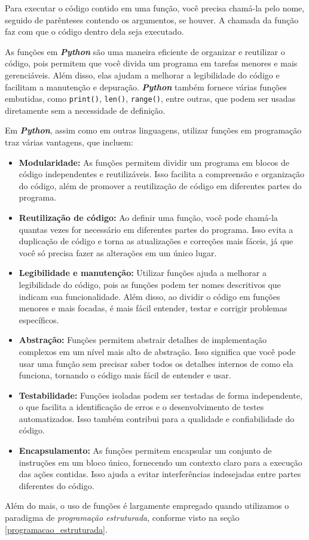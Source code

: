 \documentclass[a4paper, 12pt, onecolumn,singlespacing]{article}
\begin{document}
	Para executar o código contido em uma função, você precisa chamá-la pelo nome, seguido de parênteses contendo os argumentos, se houver. A chamada da função faz com que o código dentro dela seja executado.
	
	As funções em \textbf{\textit{Python}} são uma maneira eficiente de organizar e reutilizar o código, pois permitem que você divida um programa em tarefas menores e mais gerenciáveis. Além disso, elas ajudam a melhorar a legibilidade do código e facilitam a manutenção e depuração. \textbf{\textit{Python}} também fornece várias funções embutidas, como \texttt{print()}, \texttt{len()}, \texttt{range()}, entre outras, que podem ser usadas diretamente sem a necessidade de definição.
	
	Em \textbf{\textit{Python}}, assim como em outras linguagens, utilizar funções em programação traz várias vantagens, que incluem:
	
	\begin{itemize}
		\item \textbf{Modularidade:} As funções permitem dividir um programa em blocos de código independentes e reutilizáveis. Isso facilita a compreensão e organização do código, além de promover a reutilização de código em diferentes partes do programa.
		
		\item \textbf{Reutilização de código:} Ao definir uma função, você pode chamá-la quantas vezes for necessário em diferentes partes do programa. Isso evita a duplicação de código e torna as atualizações e correções mais fáceis, já que você só precisa fazer as alterações em um único lugar.
		
		\item \textbf{Legibilidade e manutenção:} Utilizar funções ajuda a melhorar a legibilidade do código, pois as funções podem ter nomes descritivos que indicam sua funcionalidade. Além disso, ao dividir o código em funções menores e mais focadas, é mais fácil entender, testar e corrigir problemas específicos.
		
		\item \textbf{Abstração:} Funções permitem abstrair detalhes de implementação complexos em um nível mais alto de abstração. Isso significa que você pode usar uma função sem precisar saber todos os detalhes internos de como ela funciona, tornando o código mais fácil de entender e usar.
		
		\item \textbf{Testabilidade:} Funções isoladas podem ser testadas de forma independente, o que facilita a identificação de erros e o desenvolvimento de testes automatizados. Isso também contribui para a qualidade e confiabilidade do código.
		
		\item \textbf{Encapsulamento:} As funções permitem encapsular um conjunto de instruções em um bloco único, fornecendo um contexto claro para a execução das ações contidas. Isso ajuda a evitar interferências indesejadas entre partes diferentes do código.
		
	\end{itemize}

	Além do mais, o uso de funções é largamente empregado quando utilizamos o paradigma de \textit{programação estruturada}, conforme visto na seção \ref{programacao_estruturada}.
	
	
\end{document}
